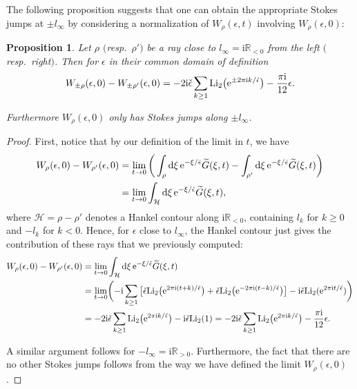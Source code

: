 \documentclass[pdftex]{sigma}
\numberwithin{equation}{section}
\newtheorem{Proposition}[Theorem]{Proposition}
 { \theoremstyle{definition}
\newtheorem{Definition}[Theorem]{Definition}
\newtheorem{Note}[Theorem]{Note}
\newtheorem{Example}[Theorem]{Example}
\newtheorem{Remark}[Theorem]{Remark} }
\begin{document}
The following proposition suggests that one can obtain the appropriate Stokes jumps at $\pm l_{\infty}$ by considering a normalization of $W_{\rho}(\epsilon,t)$ involving $W_{\rho}(\epsilon,0)$:
\begin{Proposition}\label{linftyjumps}
Let $\rho$ $($resp.\ $\rho')$ be a ray close to $l_{\infty}=\mathrm{i} \mathbb{R}_{<0}$ from the left $($resp.\ right$)$. Then for $\epsilon$ in their common domain of definition
\begin{equation*}
 W_{\pm \rho}(\epsilon,0)-W_{\pm \rho'}(\epsilon,0)=-2\mathrm{i}\check{\epsilon}\sum_{k\geq 1} \mathrm{Li}_2\big({\rm e}^{\pm 2\pi \mathrm{i} k/\check\epsilon}\big) -\frac{\pi \mathrm{i} }{12}\epsilon.
\end{equation*}

Furthermore $W_{\rho}(\epsilon,0)$ only has Stokes jumps along $\pm l_{\infty}$.
\end{Proposition}
\begin{proof}
First, notice that by our definition of the limit in $t$, we have
\begin{equation*}
\begin{split}
 W_{\rho}(\epsilon,0)-W_{\rho'}(\epsilon,0)
 & =\lim_{t\to 0}\bigg(\int_{\rho}{\rm d}\xi\, {\rm e}^{-\xi/\check{\epsilon}} \widetilde{G}(\xi,t)-\int_{\rho'}{\rm d}\xi\, {\rm e}^{-\xi/\check{\epsilon}} \widetilde{G}(\xi,t)\bigg)\\
& =\lim_{t\to 0}\int_{\mathcal{H}}{\rm d}\xi \,{\rm e}^{-\xi/\check{\epsilon}}\widetilde{G}(\xi,t),
\end{split}
 \end{equation*}
where $\mathcal{H}=\rho-\rho'$ denotes a Hankel contour along $\mathrm{i}\mathbb{R}_{<0}$, containing $l_k$ for $k\geq 0$ and $-l_{k}$ for $k<0$. Hence, for $\epsilon$ close to $l_{\infty}$, the Hankel contour just gives the contribution of these rays that we previously computed:
\begin{align*}
 W_{\rho}(\epsilon,0)-W_{\rho'}(\epsilon,0)
 &=\lim_{t\to 0}\int_{\mathcal{H}}{\rm d}\xi \, {\rm e}^{-\xi/\check{\epsilon}}\widetilde{G}(\xi,t)\\
 &=\lim_{t\to 0} \biggl(-\mathrm{i}\sum_{k\geq 1}\big[ \check\epsilon \mathrm{Li}_2\big({\rm e}^{2\pi \mathrm{i}(t+k)/\check\epsilon}\big)+\check\epsilon \mathrm{Li}_2\big({\rm e}^{-2\pi \mathrm{i}(t-k)/\check\epsilon}\big)\big]
 -\mathrm{i}\check\epsilon \mathrm{Li}_2({\rm e}^{2\pi \mathrm{i} t/\check\epsilon})\biggr)\\
 &=-2\mathrm{i}\check{\epsilon}\sum_{k\geq 1} \mathrm{Li}_2\big({\rm e}^{2\pi \mathrm{i} k/\check\epsilon}\big) -\mathrm{i}\check\epsilon \mathrm{Li}_2(1)
 =-2\mathrm{i}\check{\epsilon}\sum_{k\geq 1} \mathrm{Li}_2\big({\rm e}^{2\pi \mathrm{i} k/\check\epsilon}\big) -\frac{\pi \mathrm{i} }{12}\epsilon.
 \end{align*}

A similar argument follows for $-l_{\infty}=\mathrm{i}\mathbb{R}_{>0}$. Furthermore, the fact that there are no other Stokes jumps follows from the way we have defined the limit $W_{\rho}(\epsilon,0)$.
\end{proof}
\end{document}
